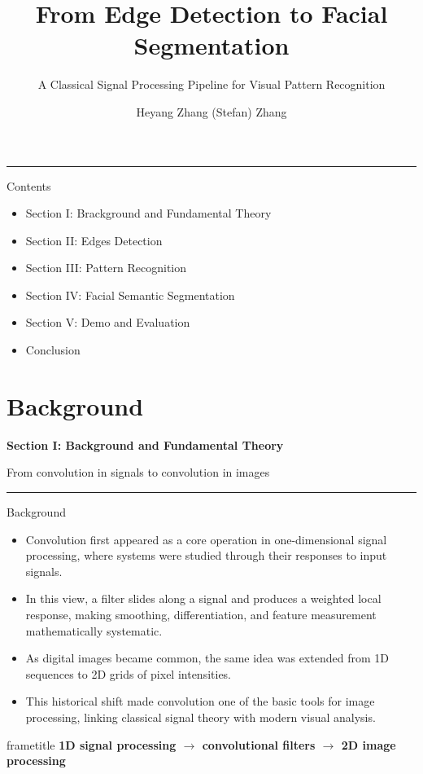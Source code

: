 \documentclass[aspectratio=169,10pt]{beamer}
\title{From Edge Detection to Facial Segmentation}
\subtitle{A Classical Signal Processing Pipeline for Visual Pattern Recognition}
\author{Heyang Zhang (Stefan) Zhang}
\institute{Sichuan University - Pittsburgh Institute}
\date{}
\newcommand{\pipelinebox}[1]{
  \begin{beamercolorbox}[wd=\linewidth,sep=0.8em,rounded=true,center]{frametitle}
    \color{SCUGreen}\bfseries #1
  \end{beamercolorbox}
}
\newcommand{\sectiondivider}[2]{
  \begin{frame}[plain]
    \vspace{1.75cm}
    {\color{SCUGreen}\bfseries\fontsize{15.2}{18}\selectfont #1\par}
    \vspace{0.42cm}
    {\color{SCUGreen}\fontsize{13.2}{15.6}\selectfont #2\par}
    \vspace{0.28cm}
    {\color{SCUGreen}\rule{0.92\linewidth}{0.55pt}\par}
    \vfill
  \end{frame}
}
\begin{document}
\begin{frame}[plain]
  \vspace{1.55cm}
  {\color{SCUGreen}\bfseries\fontsize{15.2}{18}\selectfont \inserttitle\par}
  \vspace{0.42cm}
  {\color{SCUGreen}\fontsize{13.2}{15.6}\selectfont \insertsubtitle\par}
  \vspace{0.28cm}
  {\color{SCUGreen}\rule{0.96\linewidth}{0.55pt}\par}
  \vfill
  {\centering\fontsize{11.8}{14}\selectfont \insertauthor\par}
  \vspace{0.75cm}
  {\centering\fontsize{11}{13}\selectfont \insertinstitute\par}
  \vspace{1.15cm}
\end{frame}

\begin{frame}[t]{Contents}
  \large
  \vspace{1.5cm}
  \begin{itemize}
    \item Section I: Brackground and Fundamental Theory
    \item Section II:  Edges Detection
    \item Section III: Pattern Recognition
    \item Section IV: Facial Semantic Segmentation
    \item Section V: Demo and Evaluation
    \item Conclusion
  \end{itemize}
\end{frame}

\section{Background}
\sectiondivider{Section I: Background and Fundamental Theory}{From convolution in signals to convolution in images}

\begin{frame}[t]{Background}
  \justifying
  \begin{itemize}
    \item Convolution first appeared as a core operation in one-dimensional signal processing, where systems were studied through their responses to input signals.
    \item In this view, a filter slides along a signal and produces a weighted local response, making smoothing, differentiation, and feature measurement mathematically systematic.
    \item As digital images became common, the same idea was extended from 1D sequences to 2D grids of pixel intensities.
    \item This historical shift made convolution one of the basic tools for image processing, linking classical signal theory with modern visual analysis.
  \end{itemize}
  \vspace{0.7em}
  \pipelinebox{1D signal processing $\rightarrow$ convolutional filters $\rightarrow$ 2D image processing}
\end{frame}
\end{document}
